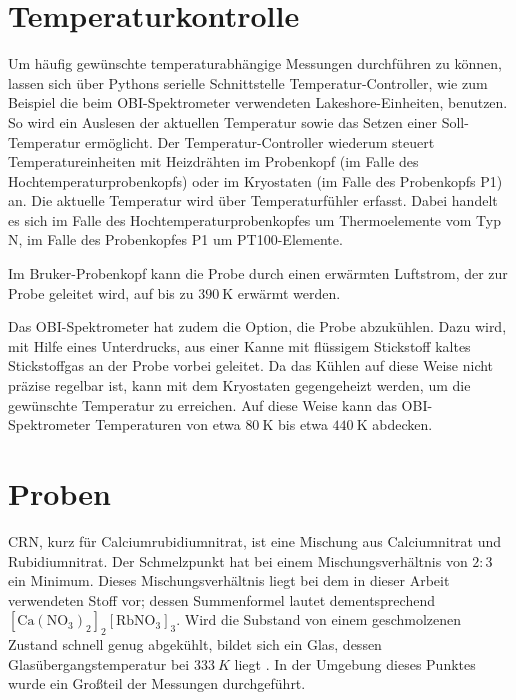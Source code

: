 \section{Temperaturkontrolle} \label{section:exp:temperaturkontrolle}

Um häufig gewünschte temperaturabhängige Messungen durchführen zu können, lassen sich über Pythons serielle Schnittstelle Temperatur-Controller, wie zum Beispiel die beim OBI-Spektrometer verwendeten Lakeshore-Einheiten, benutzen. So wird ein Auslesen der aktuellen Temperatur sowie das Setzen einer Soll-Temperatur ermöglicht. Der Temperatur-Controller wiederum steuert Temperatureinheiten mit Heizdrähten im Probenkopf (im Falle des Hochtemperaturprobenkopfs) oder im Kryostaten (im Falle des Probenkopfs P1) an. Die aktuelle Temperatur wird über Temperaturfühler erfasst. Dabei handelt es sich im Falle des Hochtemperaturprobenkopfes um Thermoelemente vom Typ N, im Falle des Probenkopfes P1 um PT100-Elemente.

Im Bruker-Probenkopf kann die Probe durch einen erwärmten Luftstrom, der zur Probe geleitet wird, auf bis zu $\SI{390}{\kelvin}$ erwärmt werden. 

Das OBI-Spektrometer hat zudem die Option, die Probe abzukühlen. Dazu wird, mit Hilfe eines Unterdrucks, aus einer Kanne mit flüssigem Stickstoff kaltes Stickstoffgas an der Probe vorbei geleitet. Da das Kühlen auf diese Weise nicht präzise regelbar ist, kann mit dem Kryostaten gegengeheizt werden, um die gewünschte Temperatur zu erreichen. Auf diese Weise kann das OBI-Spektrometer Temperaturen von etwa $\SI{80}{\kelvin}$ bis etwa $\SI{440}{\kelvin}$ abdecken.




\section{Proben} \label{section:exp:proben}


CRN, kurz für Calciumrubidiumnitrat, ist eine Mischung aus Calciumnitrat und Rubidiumnitrat. Der Schmelzpunkt hat bei einem Mischungsverhältnis von $2 : 3$ ein Minimum. Dieses Mischungsverhältnis liegt bei dem in dieser Arbeit verwendeten Stoff vor; dessen Summenformel lautet dementsprechend $[\text{Ca}(\text{NO}_\text{3})_\text{2}]_\text{2}[\text{RbNO}_\text{3}]_\text{3}$. Wird die Substand von einem geschmolzenen Zustand schnell genug abgekühlt, bildet sich ein Glas, dessen Glasübergangstemperatur bei $\SI{333}{K}$ liegt \cite{PIMENOV199793}. In der Umgebung dieses Punktes wurde ein Großteil der Messungen durchgeführt.

